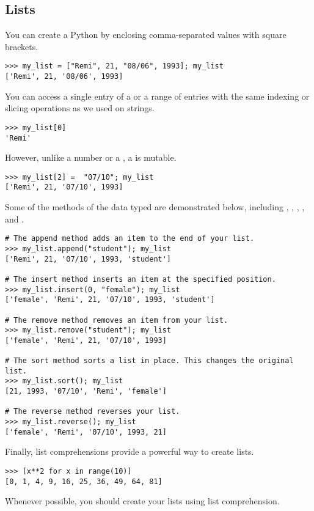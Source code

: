 \subsection*{Lists}
\begin{example}
You can create a Python  by enclosing comma-separated values with square brackets. 
\begin{lstlisting}
>>> my_list = ["Remi", 21, "08/06", 1993]; my_list
['Remi', 21, '08/06', 1993]
\end{lstlisting}
You can access a single entry of a  or a range of entries with the same indexing or slicing operations as we used on strings. 
\begin{lstlisting}
>>> my_list[0]
'Remi'
\end{lstlisting}
However, unlike a number or a , a  is mutable. 
\begin{lstlisting}
>>> my_list[2] =  "07/10"; my_list
['Remi', 21, '07/10', 1993]
\end{lstlisting}
Some of the methods of the  data typed are demonstrated below, including , , , , and .

\begin{lstlisting}
# The append method adds an item to the end of your list.
>>> my_list.append("student"); my_list
['Remi', 21, '07/10', 1993, 'student']

# The insert method inserts an item at the specified position. 
>>> my_list.insert(0, "female"); my_list
['female', 'Remi', 21, '07/10', 1993, 'student']

# The remove method removes an item from your list.
>>> my_list.remove("student"); my_list
['female', 'Remi', 21, '07/10', 1993]

# The sort method sorts a list in place. This changes the original list.
>>> my_list.sort(); my_list
[21, 1993, '07/10', 'Remi', 'female']

# The reverse method reverses your list.
>>> my_list.reverse(); my_list
['female', 'Remi', '07/10', 1993, 21]
\end{lstlisting}

Finally, list comprehensions provide a powerful way to create lists. 
\begin{lstlisting}
>>> [x**2 for x in range(10)]
[0, 1, 4, 9, 16, 25, 36, 49, 64, 81]
\end{lstlisting}

Whenever possible, you should create your lists using list comprehension.
\label{exp:lists}
\end{example}

